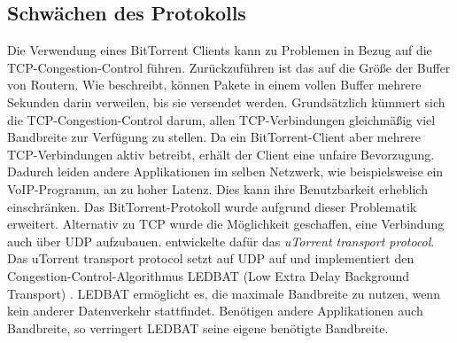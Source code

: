\subsection{Schwächen des Protokolls}

Die Verwendung eines BitTorrent Clients kann zu Problemen in Bezug auf die TCP-Congestion-Control führen. Zurückzuführen ist das auf die Größe der Buffer von Routern. Wie \textcite{gettys2011Bufferbloat} beschreibt, können Pakete in einem vollen Buffer mehrere Sekunden darin verweilen, bis sie versendet werden. Grundsätzlich kümmert sich die TCP-Congestion-Control darum, allen TCP-Verbindungen gleichmäßig viel Bandbreite zur Verfügung zu stellen. Da ein BitTorrent-Client aber mehrere TCP-Verbindungen aktiv betreibt, erhält der Client eine unfaire Bevorzugung. Dadurch leiden andere Applikationen im selben Netzwerk, wie beispielsweise ein VoIP-Programm, an zu hoher Latenz. Dies kann  ihre Benutzbarkeit erheblich einschränken. Das BitTorrent-Protokoll wurde aufgrund dieser Problematik erweitert. Alternativ zu TCP wurde die Möglichkeit geschaffen, eine Verbindung auch über UDP aufzubauen. \textcite{norberg2009utorrent} entwickelte dafür das \emph{uTorrent transport protocol}. Das uTorrent transport protocol setzt auf UDP auf und implementiert den Congestion-Control-Algorithmus LEDBAT (Low Extra Delay Background Transport) \parencite{shalunov2012low}. LEDBAT ermöglicht es, die maximale Bandbreite zu nutzen, wenn kein anderer Datenverkehr stattfindet. Benötigen andere Applikationen auch Bandbreite, so verringert LEDBAT seine eigene benötigte Bandbreite.